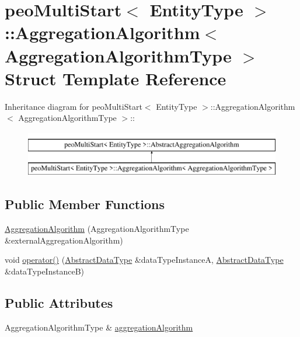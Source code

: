 \hypertarget{structpeoMultiStart_1_1AggregationAlgorithm}{
\section{peo\-Multi\-Start$<$ Entity\-Type $>$::Aggregation\-Algorithm$<$ Aggregation\-Algorithm\-Type $>$ Struct Template Reference}
\label{structpeoMultiStart_1_1AggregationAlgorithm}
}
Inheritance diagram for peo\-Multi\-Start$<$ Entity\-Type $>$::Aggregation\-Algorithm$<$ Aggregation\-Algorithm\-Type $>$::\begin{figure}[H]
\begin{center}
\leavevmode
\includegraphics[height=2cm]{structpeoMultiStart_1_1AggregationAlgorithm}
\end{center}
\end{figure}
\subsection*{Public Member Functions}
\begin{CompactItemize}
\item 
\hypertarget{structpeoMultiStart_1_1AggregationAlgorithm_2465c461bfcd70c60db220b848ef76da}{
\hyperlink{structpeoMultiStart_1_1AggregationAlgorithm_2465c461bfcd70c60db220b848ef76da}{Aggregation\-Algorithm} (Aggregation\-Algorithm\-Type \&external\-Aggregation\-Algorithm)}
\label{structpeoMultiStart_1_1AggregationAlgorithm_2465c461bfcd70c60db220b848ef76da}

\item 
\hypertarget{structpeoMultiStart_1_1AggregationAlgorithm_5c095e1e53c6803e7e1fd8b749ec9758}{
void \hyperlink{structpeoMultiStart_1_1AggregationAlgorithm_5c095e1e53c6803e7e1fd8b749ec9758}{operator()} (\hyperlink{structpeoMultiStart_1_1AbstractDataType}{Abstract\-Data\-Type} \&data\-Type\-Instance\-A, \hyperlink{structpeoMultiStart_1_1AbstractDataType}{Abstract\-Data\-Type} \&data\-Type\-Instance\-B)}
\label{structpeoMultiStart_1_1AggregationAlgorithm_5c095e1e53c6803e7e1fd8b749ec9758}

\end{CompactItemize}
\subsection*{Public Attributes}
\begin{CompactItemize}
\item 
\hypertarget{structpeoMultiStart_1_1AggregationAlgorithm_84bd7251c4f117fdbb3bbd68d90f6d35}{
Aggregation\-Algorithm\-Type \& \hyperlink{structpeoMultiStart_1_1AggregationAlgorithm_84bd7251c4f117fdbb3bbd68d90f6d35}{aggregation\-Algorithm}}
\label{structpeoMultiStart_1_1AggregationAlgorithm_84bd7251c4f117fdbb3bbd68d90f6d35}

\end{CompactItemize}


